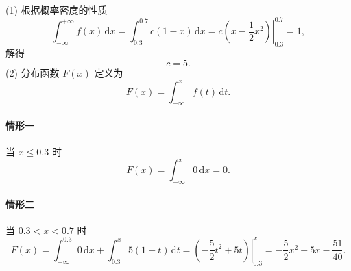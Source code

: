 \begin{solution}
    (1) 根据概率密度的性质
    $$
        \int_{-\infty}^{+\infty} f(x) \,\mathrm{d}x
        = \int_{0.3}^{0.7} c(1-x) \,\mathrm{d}x
        = \left.c\left(x-\frac{1}{2}x^2\right)\right|_{0.3}^{0.7}
        = 1,
    $$
    解得
    $$
        c = 5.
    $$
    (2) 分布函数 $F(x)$ 定义为
    $$
        F(x) = \int_{-\infty}^{x} f(t) \,\mathrm{d}t.
    $$
    \paragraph{情形一} 当 $x \leqslant 0.3$ 时
    $$
        F(x) = \int_{-\infty}^{x} 0 \,\mathrm{d}x = 0.
    $$
    \paragraph{情形二} 当 $0.3<x<0.7$ 时
    $$
        F(x) = \int_{-\infty}^{0.3} 0\,\mathrm{d}x + \int_{0.3}^x 5(1-t)\,\mathrm{d}t
        = \left.\left(-\frac{5}{2}t^2 + 5t\right)\right|_{0.3}^{x}
        = -\frac{5}{2}x^2 + 5x - \frac{51}{40}.
    $$

\end{solution}
